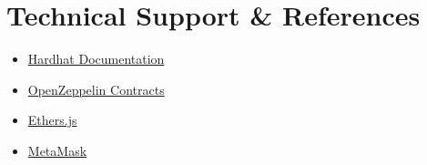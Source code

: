 \documentclass{article}
\begin{document}
\section{Technical Support \& References}
\begin{itemize}
    \item \href{https://hardhat.org/}{Hardhat Documentation}
    \item \href{https://docs.openzeppelin.com/contracts/}{OpenZeppelin Contracts}
    \item \href{https://docs.ethers.io/}{Ethers.js}
    \item \href{https://metamask.io/}{MetaMask}
\end{itemize}
\end{document}
